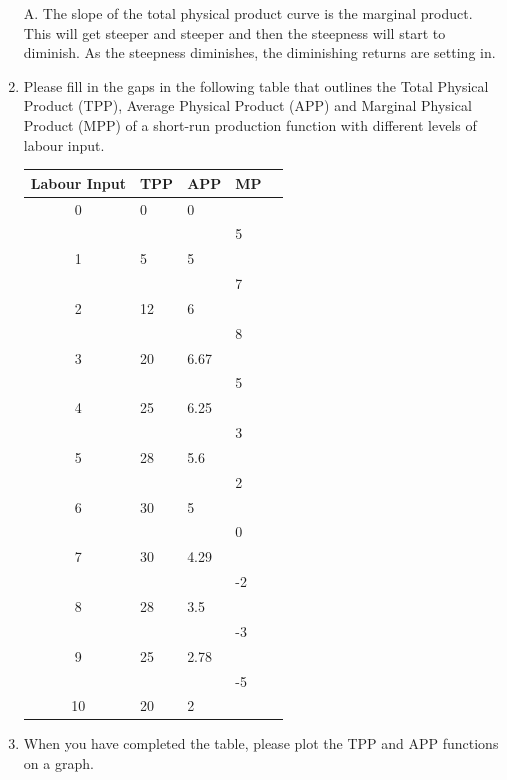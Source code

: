 \documentclass[12pt, a4paper, oneside]{article}\usepackage[]{graphicx}\usepackage[]{color}
\newenvironment{knitrout}{}{} %
\begin{document}
\begin{enumerate}
A. The slope of the total physical product curve is the marginal product.  This will get steeper and steeper and then the steepness will start to diminish.  As the steepness diminishes, the diminishing returns are setting in. 

\item Please fill in the gaps in the following table that outlines the Total 
Physical Product (TPP), Average Physical Product (APP) and Marginal Physical Product (MPP) of a short-run production function with different levels of labour input.   



\begin{tabular}{c | p{2cm}p{2cm}p{2cm}p{2cm}}
Labour Input & TPP & APP & MP \\
\hline
0 & 0 & 0 & \\
  & & & 5 \\
1 & 5  &5  & \\
  & & & 7  \\
2 & 12 & 6 & \\
  & & & 8 \\
3 & 20& 6.67& \\
  & & &  5\\
4 & 25 & 6.25 & \\
  & & & 3\\
5 & 28 & 5.6 & \\
  & & & 2 \\
6 & 30 & 5 & \\
  & & & 0  \\
7 & 30 & 4.29 & \\
  & & &  -2\\
8 & 28 &3.5 & \\
  & & & -3  \\
9 & 25 & 2.78& \\
  & & & -5 \\
10 &20 & 2& \\
\hline
\end{tabular}
\item When you have completed the table, please plot the TPP and APP functions on a graph.

\begin{knitrout}
\color{fgcolor}


\end{knitrout}
\end{enumerate}
\end{document}

